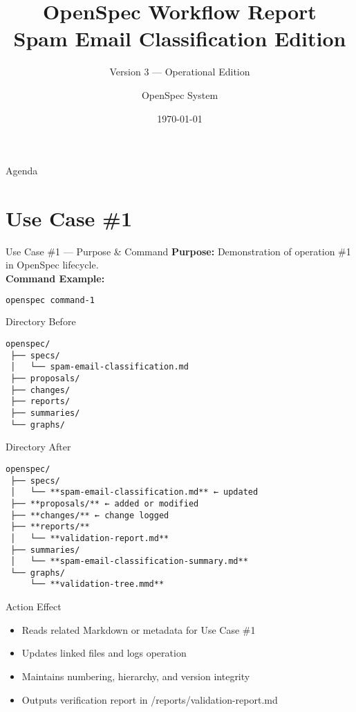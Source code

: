 \documentclass[aspectratio=169]{beamer}
\title[OpenSpec v3]{\textbf{OpenSpec Workflow Report}\\Spam Email Classification Edition}
\subtitle{Version 3 --- Operational Edition}
\author{OpenSpec System}
\date{\today}
\begin{document}
\begin{frame}
  \titlepage
\end{frame}

\begin{frame}{Agenda}
  \tableofcontents
\end{frame}
\section*{Use Case \#1}
\begin{frame}{Use Case \#1 --- Purpose \& Command}
\textbf{Purpose:} Demonstration of operation \#1 in OpenSpec lifecycle.\\[4pt]
\textbf{Command Example:}
\begin{lstlisting}[language=bash]
openspec command-1
\end{lstlisting}
\end{frame}

\begin{frame}{Directory Before}
\begin{lstlisting}
openspec/
 ├── specs/
 │   └── spam-email-classification.md
 ├── proposals/
 ├── changes/
 ├── reports/
 ├── summaries/
 └── graphs/
\end{lstlisting}
\end{frame}

\begin{frame}{Directory After}
\begin{lstlisting}
openspec/
 ├── specs/
 │   └── **spam-email-classification.md** ← updated
 ├── **proposals/** ← added or modified
 ├── **changes/** ← change logged
 ├── **reports/**
 │   └── **validation-report.md**
 ├── summaries/
 │   └── **spam-email-classification-summary.md**
 └── graphs/
     └── **validation-tree.mmd**
\end{lstlisting}
\end{frame}

\begin{frame}{Action Effect}
\begin{itemize}
  \item Reads related Markdown or metadata for Use Case \#1
  \item Updates linked files and logs operation
  \item Maintains numbering, hierarchy, and version integrity
  \item Outputs verification report in /reports/validation-report.md
\end{itemize}
\end{frame}
\end{document}
